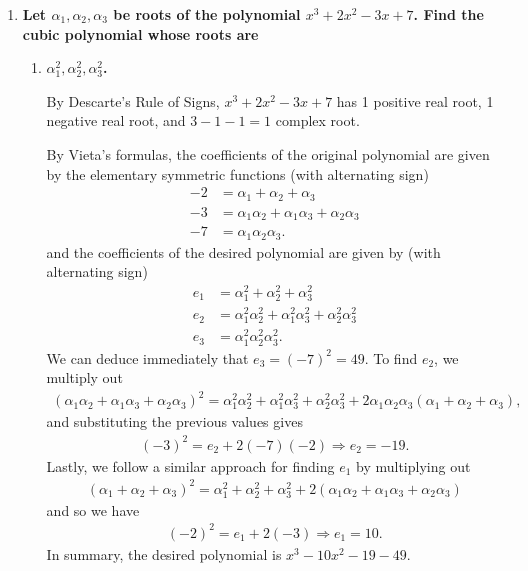 \documentclass[12pt]{article}
\begin{document}
\begin{enumerate}
    \item
        \boldmath\textbf{Let $\alpha_1, \alpha_2, \alpha_3$ be roots of the polynomial $x^3+2x^2-3x+7$.  Find the cubic polynomial whose roots are
        }\unboldmath
        \begin{enumerate}
            \item
                \boldmath\textbf{$\alpha_1^2, \alpha_2^2, \alpha_3^2$.
                }\unboldmath \par
                By Descarte's Rule of Signs, $x^3 + 2x^2 - 3x + 7$ has 1 positive real root, 1 negative real root, and $3 - 1 - 1 = 1$ complex root. \par
                By Vieta's formulas, the coefficients of the original polynomial are given by the elementary symmetric functions (with alternating sign)
                \begin{align*}
                    -2 &= \alpha_1 + \alpha_2 + \alpha_3 \\
                    -3 &= \alpha_1\alpha_2 + \alpha_1\alpha_3 + \alpha_2\alpha_3 \\
                    -7 &= \alpha_1\alpha_2\alpha_3.
                \end{align*}
                and the coefficients of the desired polynomial are given by (with alternating sign)
                \begin{align*}
                    e_1 &= \alpha_1^2 + \alpha_2^2 + \alpha_3^2 \\
                    e_2 &= \alpha_1^2\alpha_2^2 + \alpha_1^2\alpha_3^2 + \alpha_2^2\alpha_3^2 \\
                    e_3 &= \alpha_1^2\alpha_2^2\alpha_3^2.
                \end{align*}
                We can deduce immediately that $e_3 = (-7)^2 = 49$. To find $e_2$, we multiply out
                \begin{align*}
                    (\alpha_1\alpha_2 + \alpha_1\alpha_3 + \alpha_2\alpha_3)^2 = \alpha_1^2\alpha_2^2 + \alpha_1^2\alpha_3^2 + \alpha_2^2\alpha_3^2 + 2\alpha_1\alpha_2\alpha_3(\alpha_1 + \alpha_2 + \alpha_3),
                \end{align*}
                and substituting the previous values gives
                \begin{align*}
                    (-3)^2 = e_2 + 2(-7)(-2) \Rightarrow e_2 = -19.
                \end{align*}
                Lastly, we follow a similar approach for finding $e_1$ by multiplying out
                \begin{align*}
                    (\alpha_1 + \alpha_2 + \alpha_3)^2 = \alpha_1^2 + \alpha_2^2 + \alpha_3^2 + 2(\alpha_1\alpha_2 + \alpha_1\alpha_3 + \alpha_2\alpha_3)
                \end{align*}
                and so we have
                \begin{align*}
                    (-2)^2 = e_1 + 2(-3) \Rightarrow e_1 = 10.
                \end{align*}
                In summary, the desired polynomial is $x^3 - 10x^2 - 19 - 49$.


\end{enumerate}
\end{enumerate}
\end{document}
